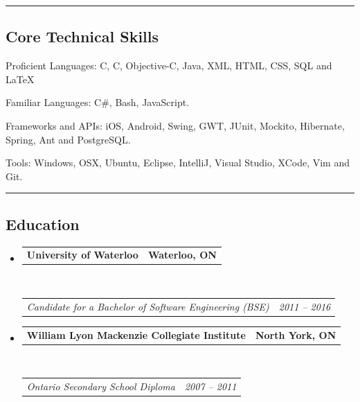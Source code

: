 \documentclass[10pt,letterpaper]{article}
\makeatletter
\newenvironment{indentsection}[1]%
{\begin{list}{}%
	{\setlength{\leftmargin}{#1}}%
	\item[]%
}
{\end{list}}
\newcommand{\headerrow}[2]
{\begin{tabular*}{\linewidth}{l@{\extracolsep{\fill}}r}
	#1 &
	#2 \\
\end{tabular*}}
\newcommand{\CPP}
{C\nolinebreak[4]\hspace{-.05em}\raisebox{.22ex}{\footnotesize\bf ++}}
\makeatother
\begin{document}
\hrule
\vspace{-0.4em}
\subsection*{Core Technical Skills}

\begin{indentsection}{\parindent}
\begin{description*}
	\item[Proficient Languages:]
	C, \CPP, Objective-C, Java, XML, HTML, CSS, SQL and \LaTeX
	\item[Familiar Languages:]
	C\#, Bash, JavaScript.
	\item[Frameworks and APIs:]
	iOS, Android, Swing, GWT, JUnit, Mockito, Hibernate, Spring, Ant and PostgreSQL.
	\item[Tools:]
	Windows, OSX, Ubuntu, Eclipse, IntelliJ, Visual Studio, XCode, Vim and Git.
\end{description*}
\end{indentsection}

\hrule
\vspace{-0.4em}
\subsection*{Education}

\begin{itemize}
	\parskip=0.1em

	\item 
	\headerrow
		{\textbf{University of Waterloo}}
		{\textbf{Waterloo, ON}}
	\\
	\headerrow
		{\emph{Candidate for a Bachelor of Software Engineering (BSE)}}
		{\emph{2011 -- 2016}}
		
	\item 
	\headerrow
		{\textbf{William Lyon Mackenzie Collegiate Institute}}
		{\textbf{North York, ON}}
	\\
	\headerrow
		{\emph{Ontario Secondary School Diploma}}
		{\emph{2007 -- 2011}}

\end{itemize}
\end{document}
